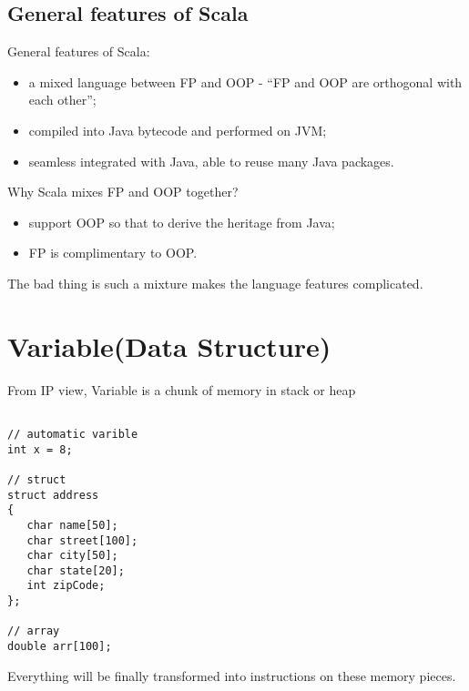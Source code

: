 \documentclass[notheorems, aspectratio=54]{beamer}
\begin{document}
\subsection{General features of Scala}
\begin{frame}[fragile]

General features of Scala:
\begin{itemize}
 \item a mixed language between FP and OOP - ``FP and OOP are orthogonal with each other'';
 \item compiled into Java bytecode and performed on JVM;
 \item seamless integrated with Java, able to reuse many Java packages.
\end{itemize}

Why Scala mixes FP and OOP together? 
\begin{itemize}
 \item support OOP so that to derive the heritage from Java;
 \item FP is complimentary to OOP.
\end{itemize}
The bad thing is such a mixture makes the language features complicated.

\end{frame}


\section{Variable(Data Structure)}
\begin{frame}[fragile]

\begin{block}{From IP view, Variable is a chunk of memory in stack or heap}
\begin{verbatim}

// automatic varible
int x = 8;

// struct 
struct address 
{ 
   char name[50]; 
   char street[100]; 
   char city[50]; 
   char state[20]; 
   int zipCode;
};

// array
double arr[100];
\end{verbatim} 
\end{block}
Everything will be finally transformed into instructions on these memory pieces.

\end{frame}


\end{document}
